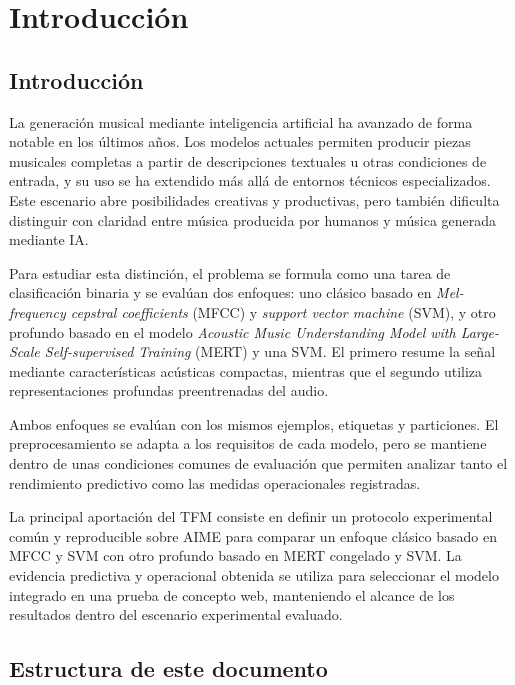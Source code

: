 \chapter{Introducción}
\label{cap:introduccion}

\section{Introducción}
\label{sec:introduccion:intro}

La generación musical mediante inteligencia artificial ha avanzado de forma notable en los últimos años. Los modelos actuales permiten producir piezas musicales completas a partir de descripciones textuales u otras condiciones de entrada, y su uso se ha extendido más allá de entornos técnicos especializados. Este escenario abre posibilidades creativas y productivas, pero también dificulta distinguir con claridad entre música producida por humanos y música generada mediante IA.

Para estudiar esta distinción, el problema se formula como una tarea de clasificación binaria y se evalúan dos enfoques: uno clásico basado en \textit{Mel-frequency cepstral coefficients} (MFCC) y \textit{support vector machine} (SVM), y otro profundo basado en el modelo \textit{Acoustic Music Understanding Model with Large-Scale Self-supervised Training} (MERT) y una SVM. El primero resume la señal mediante características acústicas compactas, mientras que el segundo utiliza representaciones profundas preentrenadas del audio.

Ambos enfoques se evalúan con los mismos ejemplos, etiquetas y particiones. El preprocesamiento se adapta a los requisitos de cada modelo, pero se mantiene dentro de unas condiciones comunes de evaluación que permiten analizar tanto el rendimiento predictivo como las medidas operacionales registradas.

La principal aportación del TFM consiste en definir un protocolo experimental común y reproducible sobre AIME para comparar un enfoque clásico basado en MFCC y SVM con otro profundo basado en MERT congelado y SVM. La evidencia predictiva y operacional obtenida se utiliza para seleccionar el modelo integrado en una prueba de concepto web, manteniendo el alcance de los resultados dentro del escenario experimental evaluado.

\section{Estructura de este documento}
\label{sec:introduccion:estructura}


